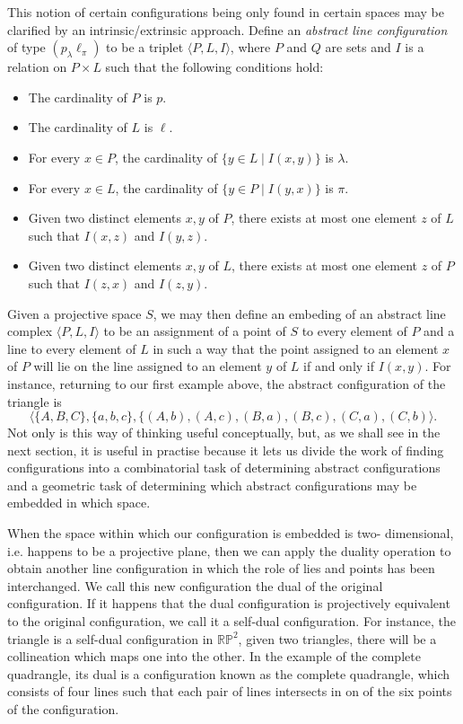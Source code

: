\documentclass[12pt]{article}
\begin{document}
This notion of certain configurations being only found in certain
spaces may be clarified by an intrinsic/extrinsic approach.  Define
an \emph{abstract line configuration} of type $(p_\lambda \ell_\pi)$ 
to be a triplet $\langle P, L, I \rangle$, where $P$ and $Q$ are sets
and $I$ is a relation on $P \times L$ such that the following 
conditions hold:
\begin{itemize}
\item The cardinality of $P$ is $p$.
\item The cardinality of $L$ is $\ell$.
\item For every $x \in P$, the cardinality of 
$\{ y \in L \mid I(x,y) \}$ is $\lambda$.
\item For every $x \in L$, the cardinality of 
$\{ y \in P \mid I(y,x) \}$ is $\pi$.
\item Given two distinct elements $x,y$ of $P$, there exists at
most one element $z$ of $L$ such that $I(x,z)$ and $I(y,z)$.
\item Given two distinct elements $x,y$ of $L$, there exists at
most one element $z$ of $P$ such that $I(z,x)$ and $I(z,y)$.
\end{itemize}
Given a projective space $S$, we may then define an embeding of an
abstract line complex $\langle P, L, I \rangle$ to be an assignment
of a point of $S$ to every element of $P$ and a line to every element
of $L$ in such a way that the point assigned to an element $x$ of
$P$ will lie on the line assigned to an element $y$ of $L$ if and
only if $I(x,y)$.  For instance, returning to our first example above,
the abstract configuration of the triangle is 
\[ \langle \{ A, B, C \}, \{ a, b, c \}, 
           \{ (A,b), (A,c), (B,a), (B,c), (C,a), (C,b) \rangle .\]
Not only is this way of thinking useful conceptually,
but, as we shall see in the next section, it is useful in practise 
because it lets us divide the work of finding configurations into a
combinatorial task of determining abstract configurations and a
geometric task of determining which abstract configurations may be
embedded in which space.

When the space within which our configuration is embedded is two-
dimensional, i.e. happens to be a projective plane, then we can 
apply the duality operation to obtain another line configuration
in which the role of lies and points has been interchanged.  We
call this new configuration the dual of the original configuration.
If it happens that the dual configuration is projectively equivalent 
to the original configuration, we call it a self-dual configuration.
For instance, the triangle is a self-dual configuration in 
$\mathbb{R}\mathbb{P}^2$, given two triangles, there will be a
collineation which maps one into the other.  In the example of the
complete quadrangle, its dual is a configuration known as the
complete quadrangle, which consists of four lines such that each
pair of lines intersects in on of the six points of the configuration.
\end{document}
